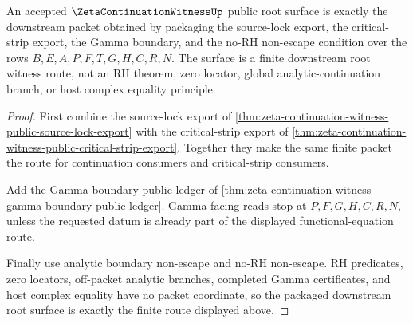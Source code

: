 \begin{theorem}
\label{thm:zeta-continuation-witness-public-root-completion}
An accepted $\ZetaContinuationWitnessUp$ public root surface is exactly the downstream packet obtained by packaging the source-lock export, the critical-strip export, the Gamma boundary, and the no-RH non-escape condition over the rows $B,E,A,P,F,T,G,H,C,R,N$. The surface is a finite downstream root witness route, not an RH theorem, zero locator, global analytic-continuation branch, or host complex equality principle.
\end{theorem}
\begin{proof}
First combine the source-lock export of \autoref{thm:zeta-continuation-witness-public-source-lock-export} with the critical-strip export of \autoref{thm:zeta-continuation-witness-public-critical-strip-export}. Together they make the same finite packet the route for continuation consumers and critical-strip consumers.

Add the Gamma boundary public ledger of \autoref{thm:zeta-continuation-witness-gamma-boundary-public-ledger}. Gamma-facing reads stop at $P,F,G,H,C,R,N$, unless the requested datum is already part of the displayed functional-equation route.

Finally use analytic boundary non-escape and no-RH non-escape. RH predicates, zero locators, off-packet analytic branches, completed Gamma certificates, and host complex equality have no packet coordinate, so the packaged downstream root surface is exactly the finite route displayed above.
\end{proof}
